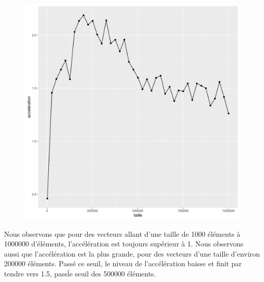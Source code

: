 \documentclass[a4paper,11pt]{scrartcl}
\begin{document}
\begin{figure}[H] \center
   \includegraphics[scale=0.5] {graphes/global_temps_machine_accel6.png}
\end{figure}

Nous observons que pour des vecteurs allant d'une taille de 1000 \'el\'ements \`a 1000000 d'\'el\'ements, l'acc\'el\'eration est toujours sup\'erieur \`a 1. Nous observons aussi que l'acc\'el\'eration est la plus grande, pour des vecteurs d'une taille d'environ 200000 \'el\'ements. Pass\'e ce seuil, le niveau de l'acc\'el\'eration baisse et finit par tendre vers 1.5, pass\' le seuil des 500000 \'el\'ements.   
\end{document}
